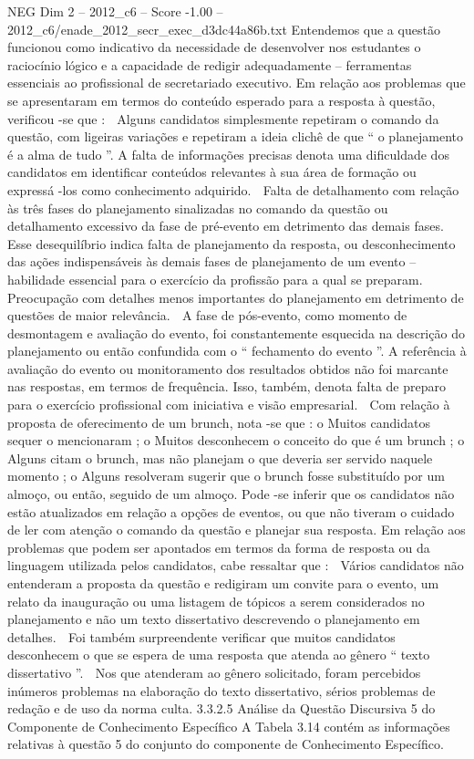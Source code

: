 \begin{textsample}{NEG Dim 2 – 2012\_c6 – Score -1.00 – 2012\_c6/enade\_2012\_secr\_exec\_d3dc44a86b.txt}
Entendemos que a questão funcionou como indicativo da necessidade de desenvolver nos estudantes o raciocínio lógico e a capacidade de redigir adequadamente – ferramentas essenciais ao profissional de secretariado executivo.
Em relação aos problemas que se apresentaram em termos do conteúdo esperado para a resposta à questão, verificou -se que :  Alguns candidatos simplesmente repetiram o comando da questão, com ligeiras variações e repetiram a ideia clichê de que “ o planejamento é a alma de tudo ”.
A falta de informações precisas denota uma dificuldade dos candidatos em identificar conteúdos relevantes à sua área de formação ou expressá -los como conhecimento adquirido.  Falta de detalhamento com relação às três fases do planejamento sinalizadas no comando da questão ou detalhamento excessivo da fase de pré-evento em detrimento das demais fases.
Esse desequilíbrio indica falta de planejamento da resposta, ou desconhecimento das ações indispensáveis às demais fases de planejamento de um evento – habilidade essencial para o exercício da profissão para a qual se preparam.  Preocupação com detalhes menos importantes do planejamento em detrimento de questões de maior relevância.  A fase de pós-evento, como momento de desmontagem e avaliação do evento, foi constantemente esquecida na descrição do planejamento ou então confundida com o “ fechamento do evento ”.
A referência à avaliação do evento ou monitoramento dos resultados obtidos não foi marcante nas respostas, em termos de frequência.
Isso, também, denota falta de preparo para o exercício profissional com iniciativa e visão empresarial.  Com relação à proposta de oferecimento de um brunch, nota -se que : o Muitos candidatos sequer o mencionaram ; o Muitos desconhecem o conceito do que é um brunch ; o Alguns citam o brunch, mas não planejam o que deveria ser servido naquele momento ; o Alguns resolveram sugerir que o brunch fosse substituído por um almoço, ou então, seguido de um almoço.
Pode -se inferir que os candidatos não estão atualizados em relação a opções de eventos, ou que não tiveram o cuidado de ler com atenção o comando da questão e planejar sua resposta.
Em relação aos problemas que podem ser apontados em termos da forma de resposta ou da linguagem utilizada pelos candidatos, cabe ressaltar que :  Vários candidatos não entenderam a proposta da questão e redigiram um convite para o evento, um relato da inauguração ou uma listagem de tópicos a serem considerados no planejamento e não um texto dissertativo descrevendo o planejamento em detalhes.  Foi também surpreendente verificar que muitos candidatos desconhecem o que se espera de uma resposta que atenda ao gênero “ texto dissertativo ”.  Nos que atenderam ao gênero solicitado, foram percebidos inúmeros problemas na elaboração do texto dissertativo, sérios problemas de redação e de uso da norma culta. 3.3.2.5 Análise da Questão Discursiva 5 do Componente de Conhecimento Específico A Tabela 3.14 contém as informações relativas à questão 5 do conjunto do componente de Conhecimento Específico.

\end{textsample}
